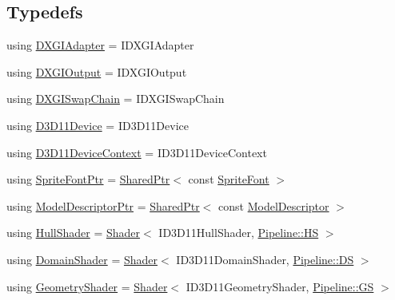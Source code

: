 \subsection*{Typedefs}
\begin{DoxyCompactItemize}
\item 
using \mbox{\hyperlink{namespacemage_1_1rendering_ad55e028ebd705b547eeb972ad8d03b6a}{D\+X\+G\+I\+Adapter}} = I\+D\+X\+G\+I\+Adapter
\item 
using \mbox{\hyperlink{namespacemage_1_1rendering_aaf22d3893277a4bd8497f6ea69b01532}{D\+X\+G\+I\+Output}} = I\+D\+X\+G\+I\+Output
\item 
using \mbox{\hyperlink{namespacemage_1_1rendering_a739d2b0d24b44bcfb16903df756fedf6}{D\+X\+G\+I\+Swap\+Chain}} = I\+D\+X\+G\+I\+Swap\+Chain
\item 
using \mbox{\hyperlink{namespacemage_1_1rendering_a7081b2c6e923fac0d42ff4862dc4a823}{D3\+D11\+Device}} = I\+D3\+D11\+Device
\item 
using \mbox{\hyperlink{namespacemage_1_1rendering_a4b23dd00d80ca4f6856375936261a13d}{D3\+D11\+Device\+Context}} = I\+D3\+D11\+Device\+Context
\item 
using \mbox{\hyperlink{namespacemage_1_1rendering_ab2f34196c20422ca3692ad3f3bff3a5d}{Sprite\+Font\+Ptr}} = \mbox{\hyperlink{namespacemage_a1e01ae66713838a7a67d30e44c67703e}{Shared\+Ptr}}$<$ const \mbox{\hyperlink{classmage_1_1rendering_1_1_sprite_font}{Sprite\+Font}} $>$
\item 
using \mbox{\hyperlink{namespacemage_1_1rendering_a07260934fd7cb48a210873ae73e62911}{Model\+Descriptor\+Ptr}} = \mbox{\hyperlink{namespacemage_a1e01ae66713838a7a67d30e44c67703e}{Shared\+Ptr}}$<$ const \mbox{\hyperlink{classmage_1_1rendering_1_1_model_descriptor}{Model\+Descriptor}} $>$
\item 
using \mbox{\hyperlink{namespacemage_1_1rendering_aa133f36cd1a81c87eedf962270a12f48}{Hull\+Shader}} = \mbox{\hyperlink{classmage_1_1rendering_1_1_shader}{Shader}}$<$ I\+D3\+D11\+Hull\+Shader, \mbox{\hyperlink{structmage_1_1rendering_1_1_pipeline_1_1_h_s}{Pipeline\+::\+HS}} $>$
\item 
using \mbox{\hyperlink{namespacemage_1_1rendering_a02bd57ea68f48dd6e0d37a1362ad1ea2}{Domain\+Shader}} = \mbox{\hyperlink{classmage_1_1rendering_1_1_shader}{Shader}}$<$ I\+D3\+D11\+Domain\+Shader, \mbox{\hyperlink{structmage_1_1rendering_1_1_pipeline_1_1_d_s}{Pipeline\+::\+DS}} $>$
\item 
using \mbox{\hyperlink{namespacemage_1_1rendering_accaa3591de8a0d7a2c72c1dcc0cf9592}{Geometry\+Shader}} = \mbox{\hyperlink{classmage_1_1rendering_1_1_shader}{Shader}}$<$ I\+D3\+D11\+Geometry\+Shader, \mbox{\hyperlink{structmage_1_1rendering_1_1_pipeline_1_1_g_s}{Pipeline\+::\+GS}} $>$

\end{DoxyCompactItemize}
